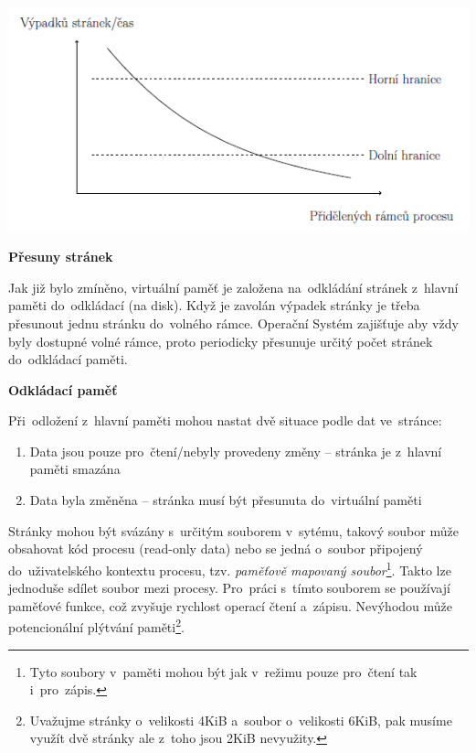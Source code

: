 \begin{center}
	\includegraphics[scale=1]{images/mem_freq_page.png}
\end{center}

\begin{Large}
	\vspace{0,5cm}
	\textbf{Přesuny stránek}
\end{Large}

Jak již bylo zmíněno, virtuální paměť je založena na~odkládání stránek z~hlavní paměti do~odkládací (na disk). Když je zavolán výpadek stránky je třeba přesunout jednu stránku do~volného rámce. Operační Systém zajišťuje aby vždy byly dostupné volné rámce, proto periodicky přesunuje určitý počet stránek do~odkládací paměti. 

\begin{large}
	\vspace{0,5cm}
	\textbf{Odkládací paměť}
\end{large}

Při~odložení z~hlavní paměti mohou nastat dvě situace podle dat ve~stránce:

\begin{enumerate}
	\item Data jsou pouze pro~čtení/nebyly provedeny změny -- stránka je z~hlavní paměti smazána
	\item Data byla změněna -- stránka musí být přesunuta do~virtuální paměti
\end{enumerate}

Stránky mohou být svázány s~určitým souborem v~sytému, takový soubor může obsahovat kód procesu (read-only data) nebo se jedná o~soubor připojený do~uživatelského kontextu procesu, tzv. \emph{paměťově mapovaný soubor}\footnote{Tyto soubory v~paměti mohou být jak v~režimu pouze pro~čtení tak i~pro~zápis.}. Takto lze jednoduše sdílet soubor mezi procesy. Pro~práci s~tímto souborem se používají paměťové funkce, což zvyšuje rychlost operací čtení a~zápisu. Nevýhodou může potencionální plýtvání paměti\footnote{Uvažujme stránky o~velikosti 4KiB a~soubor o~velikosti 6KiB, pak musíme využít dvě stránky ale z~toho jsou 2KiB nevyužity.}. 

